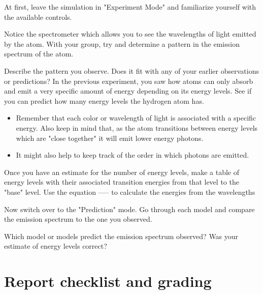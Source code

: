 \begin{steps}
	\item At first, leave the simulation in "Experiment Mode" and familiarize yourself with the available controls. 
	
	\item Notice the spectrometer which allows you to see the wavelengths of light emitted by the atom. With your group, try and determine a pattern in the emission spectrum of the atom. 
	
	\item Describe the pattern you observe. Does it fit with any of your earlier observations or predictions? In the previous experiment, you saw how atoms can only absorb and emit a very specific amount of energy depending on its energy levels. See if you can predict how many energy levels the hydrogen atom has.
	\begin{itemize}
		\item Remember that each color or wavelength of light is associated with a specific energy. Also keep in mind that, as the atom transitions between energy levels which are "close together" it will emit lower energy photons. 
		
		\item It might also help to keep track of the order in which photons are emitted.
	\end{itemize}

	\item Once you have an estimate for the number of energy levels, make a table of energy levels with their associated transition energies from that level to the "base" level. Use the equation ----- to calculate the energies from the wavelengths %
	
	\item Now switch over to the "Prediction" mode. Go through each model and compare the emission spectrum to the one you observed. 
	
	\item Which model or models predict the emission spectrum observed? Was your estimate of energy levels correct? 
\end{steps}

\section{Report checklist and grading}
